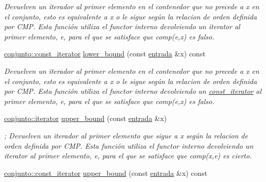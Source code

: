 \begin{DoxyCompactItemize}
\begin{DoxyCompactList}\small\item\em Devuelven un iterador al primer elemento en el contenedor que no precede a x en el conjunto, esto es equivalente a x o le sigue según la relacion de orden definida por C\+M\+P. Esta función utiliza el functor interno devolviendo un iterator al primer elemento, e, para el que se satisface que comp(e,x) es falso. \end{DoxyCompactList}\item 
\hypertarget{classconjunto_a18395c2165b2f0235021a76d3751c787}{}\hyperlink{classconjunto_1_1const__iterator}{conjunto\+::const\+\_\+iterator} \hyperlink{classconjunto_a18395c2165b2f0235021a76d3751c787}{lower\+\_\+bound} (const \hyperlink{classconjunto_a7630ace7cb17bcec07daf5804f1a0780}{entrada} \&x) const \label{classconjunto_a18395c2165b2f0235021a76d3751c787}

\begin{DoxyCompactList}\small\item\em Devuelven un iterador al primer elemento en el contenedor que no precede a x en el conjunto, esto es equivalente a x o le sigue según la relacion de orden definida por C\+M\+P. Esta función utiliza el functor interno devolviendo un \hyperlink{classconjunto_1_1const__iterator}{const\+\_\+iterator} al primer elemento, e, para el que se satisface que comp(e,x) es falso. \end{DoxyCompactList}\item 
\hypertarget{classconjunto_a495b52c4b03342ce220f17e224ccda3e}{}\hyperlink{classconjunto_1_1iterator}{conjunto\+::iterator} \hyperlink{classconjunto_a495b52c4b03342ce220f17e224ccda3e}{upper\+\_\+bound} (const \hyperlink{classconjunto_a7630ace7cb17bcec07daf5804f1a0780}{entrada} \&x)\label{classconjunto_a495b52c4b03342ce220f17e224ccda3e}

\begin{DoxyCompactList}\small\item\em ; Devuelven un iterador al primer elemento que sigue a x según la relacion de orden definida por C\+M\+P. Esta función utiliza el functor interno devolviendo un iterator al primer elemento, e, para el que se satisface que comp(x,e) es cierto. \end{DoxyCompactList}\item 
\hypertarget{classconjunto_ae9460e883908ad60b6806d04ab57b7de}{}\hyperlink{classconjunto_1_1const__iterator}{conjunto\+::const\+\_\+iterator} \hyperlink{classconjunto_ae9460e883908ad60b6806d04ab57b7de}{upper\+\_\+bound} (const \hyperlink{classconjunto_a7630ace7cb17bcec07daf5804f1a0780}{entrada} \&x) const \label{classconjunto_ae9460e883908ad60b6806d04ab57b7de}


\end{DoxyCompactItemize}
